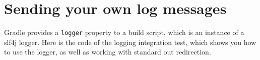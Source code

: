 \section{Sending your own log messages} %
\label{sec:sending_your_own_log_messages}
Gradle provides a \texttt{logger} property to a build script, which is an instance of a slf4j logger. Here is the code of the logging integration test, which shows you how to use the logger, as well as working with standard out redirection.
